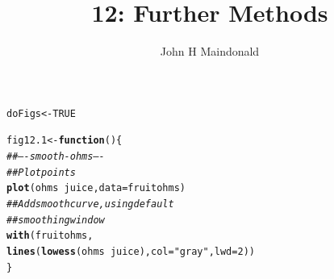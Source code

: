 \documentclass[12pt, a4paper,  BCOR=8.25mm, DIV=15]{scrartcl}\usepackage[]{graphicx}\usepackage[]{color}
\makeatletter
\newcommand{\hlnum}[1]{\textcolor[rgb]{0.686,0.059,0.569}{#1}}%
\newcommand{\hlstr}[1]{\textcolor[rgb]{0.192,0.494,0.8}{#1}}%
\newcommand{\hlcom}[1]{\textcolor[rgb]{0.678,0.584,0.686}{\textit{#1}}}%
\newcommand{\hlopt}[1]{\textcolor[rgb]{0,0,0}{#1}}%
\newcommand{\hlstd}[1]{\textcolor[rgb]{0.345,0.345,0.345}{#1}}%
\newcommand{\hlkwa}[1]{\textcolor[rgb]{0.161,0.373,0.58}{\textbf{#1}}}%
\newcommand{\hlkwb}[1]{\textcolor[rgb]{0.69,0.353,0.396}{#1}}%
\newcommand{\hlkwc}[1]{\textcolor[rgb]{0.333,0.667,0.333}{#1}}%
\newcommand{\hlkwd}[1]{\textcolor[rgb]{0.737,0.353,0.396}{\textbf{#1}}}%
\newenvironment{kframe}{%
 \def\at@end@of@kframe{}%
 \ifinner\ifhmode%
  \def\at@end@of@kframe{\end{minipage}}%
  \begin{minipage}{\columnwidth}%
 \fi\fi%
 \def\FrameCommand##1{\hskip\@totalleftmargin \hskip-\fboxsep
 \colorbox{shadecolor}{##1}\hskip-\fboxsep
     \hskip-\linewidth \hskip-\@totalleftmargin \hskip\columnwidth}%
 \MakeFramed {\advance\hsize-\width
   \@totalleftmargin\z@ \linewidth\hsize
   \@setminipage}}%
 {\par\unskip\endMakeFramed%
 \at@end@of@kframe}
\newenvironment{knitrout}{}{} %
\makeatother
\begin{document}



\title{12: Further Methods}
\author{John H Maindonald}
\maketitle
\vspace{-0.5cm}

\begin{knitrout}
\color{fgcolor}\begin{kframe}
\begin{alltt}
\hlstd{doFigs} \hlkwb{<-} \hlnum{TRUE}
\end{alltt}
\end{kframe}
\end{knitrout}
\vspace{-0.5cm}

\begin{knitrout}
\color{fgcolor}\begin{kframe}
\begin{alltt}
\hlstd{fig12.1} \hlkwb{<-} \hlkwa{function}\hlstd{()\{}
\hlcom{## ---- smooth-ohms ----}
\hlcom{## Plot points}
\hlkwd{plot}\hlstd{(ohms} \hlopt{~} \hlstd{juice,} \hlkwc{data}\hlstd{=fruitohms)}
\hlcom{## Add smooth curve, using default}
\hlcom{## smoothing window}
\hlkwd{with}\hlstd{(fruitohms,}
     \hlkwd{lines}\hlstd{(}\hlkwd{lowess}\hlstd{(ohms} \hlopt{~} \hlstd{juice),} \hlkwc{col}\hlstd{=}\hlstr{"gray"}\hlstd{,} \hlkwc{lwd}\hlstd{=}\hlnum{2}\hlstd{))}
\hlstd{\}}
\end{alltt}
\end{kframe}
\end{knitrout}
\end{document}
